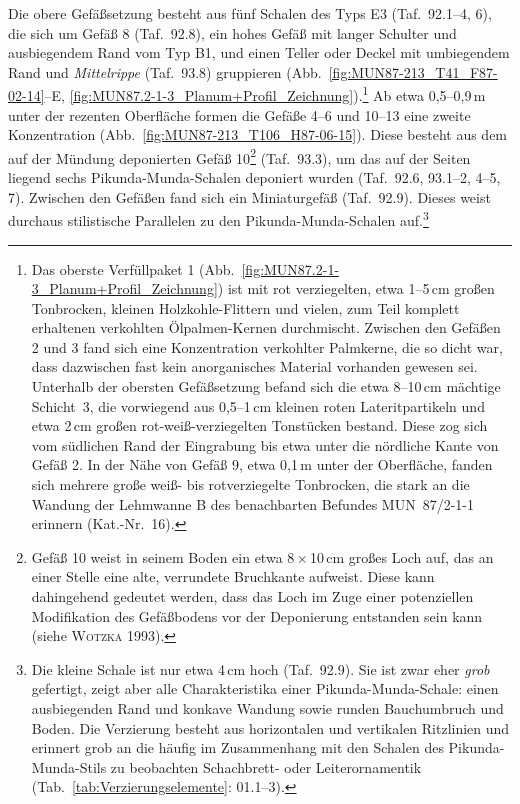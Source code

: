 Die obere Gefäßsetzung besteht aus fünf Schalen des Typs E3 (Taf.~92.1--4, 6), die sich um Gefäß 8 (Taf.~92.8), ein hohes Gefäß mit langer Schulter und ausbiegendem Rand vom Typ B1, und einen Teller oder Deckel mit umbiegendem Rand und \textit{Mittelrippe} (Taf.~93.8) gruppieren (Abb.~\ref{fig:MUN87-213_T41_F87-02-14}--E, \ref{fig:MUN87.2-1-3_Planum+Profil_Zeichnung}).\footnote{Das oberste Verfüllpaket 1 (Abb.~\ref{fig:MUN87.2-1-3_Planum+Profil_Zeichnung}) ist mit rot verziegelten, etwa 1--5\,cm großen Tonbrocken, kleinen Holzkohle-Flittern und vielen, zum Teil komplett erhaltenen verkohlten Ölpalmen-Kernen durchmischt. Zwischen den Gefäßen 2 und 3 fand sich eine Konzentration verkohlter Palmkerne, die so dicht war, dass dazwischen fast kein anorganisches Material vorhanden gewesen sei. Unterhalb der obersten Gefäßsetzung befand sich die etwa 8--10\,cm mächtige Schicht~3, die vorwiegend aus 0,5--1\,cm kleinen roten Lateritpartikeln und etwa 2\,cm großen rot-weiß-verziegelten Tonstücken bestand. Diese zog sich vom südlichen Rand der Eingrabung bis etwa unter die nördliche Kante von Gefäß 2. In der Nähe von Gefäß 9, etwa 0,1\,m unter der Oberfläche, fanden sich mehrere große weiß- bis rotverziegelte Tonbrocken, die stark an die Wandung der Lehmwanne B des benachbarten Befundes MUN~87/2-1-1 erinnern (Kat.-Nr.~16).} Ab etwa 0,5--0,9\,m unter der rezenten Oberfläche formen die Gefäße 4--6 und 10--13 eine zweite Konzentration (Abb.~\ref{fig:MUN87-213_T106_H87-06-15}). Diese besteht aus dem auf der Mündung deponierten Gefäß 10\footnote{Gefäß 10 weist in seinem Boden ein etwa 8\,$\times$\,10\,cm großes Loch auf, das an einer Stelle eine alte, verrundete Bruchkante aufweist. Diese kann dahingehend gedeutet werden, dass das Loch im Zuge einer potenziellen Modifikation des Gefäßbodens vor der Deponierung entstanden sein kann (siehe \textsc{Wotzka} 1993).} (Taf.~93.3), um das auf der Seiten liegend sechs Pikunda-Munda-Schalen deponiert wurden (Taf.~92.6, 93.1--2, 4--5, 7). Zwischen den Gefäßen fand sich ein Miniaturgefäß (Taf.~92.9). Dieses weist durchaus stilistische Parallelen zu den Pikunda-Munda-Schalen auf.\footnote{Die kleine Schale ist nur etwa 4\,cm hoch (Taf.~92.9). Sie ist zwar eher \textit{grob} gefertigt, zeigt aber alle Charakteristika einer Pikunda-Munda-Schale: einen ausbiegenden Rand und konkave Wandung sowie runden Bauchumbruch und Boden. Die Verzierung besteht aus horizontalen und vertikalen Ritzlinien und erinnert grob an die häufig im Zusammenhang mit den Schalen des Pikunda-Munda-Stils zu beobachten Schachbrett- oder Leiterornamentik (Tab.~\ref{tab:Verzierungselemente}: 01.1--3).}

